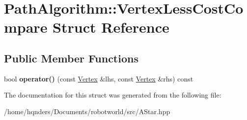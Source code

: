 \hypertarget{struct_path_algorithm_1_1_vertex_less_cost_compare}{}\section{Path\+Algorithm\+:\+:Vertex\+Less\+Cost\+Compare Struct Reference}
\label{struct_path_algorithm_1_1_vertex_less_cost_compare}
\subsection*{Public Member Functions}
\begin{DoxyCompactItemize}
\item 
bool {\bfseries operator()} (const \hyperlink{struct_path_algorithm_1_1_vertex}{Vertex} \&lhs, const \hyperlink{struct_path_algorithm_1_1_vertex}{Vertex} \&rhs) const \hypertarget{struct_path_algorithm_1_1_vertex_less_cost_compare_a3fc58f67297b1342d575dde2c275dd48}{}\label{struct_path_algorithm_1_1_vertex_less_cost_compare_a3fc58f67297b1342d575dde2c275dd48}

\end{DoxyCompactItemize}


The documentation for this struct was generated from the following file\+:\begin{DoxyCompactItemize}
\item 
/home/hqnders/\+Documents/robotworld/src/A\+Star.\+hpp\end{DoxyCompactItemize}
